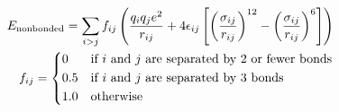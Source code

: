 \begin{equation}
\begin{split}
E_\mathrm{nonbonded} = \sum_{i>j} f_{ij} 
                \left (
                        \frac {q_i q_j e^2}{r_{ij}}
                    + 4 \epsilon_{ij} 
                    \left  [  
                        \left ( \frac{\sigma_{ij}}{r_{ij}}\right )^{12}
                      - \left ( \frac{\sigma_{ij}}{r_{ij}}\right )^{6}
                    \right ]
                \right )
\\
f_{ij} = 
  \begin{dcases*}
   0    & if $i$ and $j$ are separated by 2 or fewer bonds\\
   0.5  & if $i$ and $j$ are separated by 3 bonds\\
   1.0  & otherwise
  \end{dcases*}
\end{split}
\end{equation}
